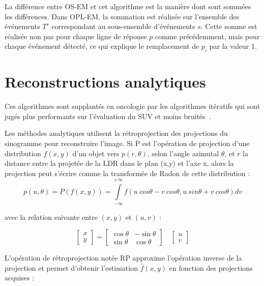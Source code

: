La différence entre OS-EM et cet algorithme est la manière dont sont sommées les différences. Dans OPL-EM, la sommation est réalisée sur l'ensemble des événements $T^s$ correspondant au sous-ensemble d'événements $s$. Cette somme est réalisée non pas pour chaque ligne de réponse $p$ comme précédemment, mais pour chaque événement détecté, ce qui explique le remplacement de $p_i$ par la valeur 1.
		
	\section{Reconstructions analytiques}

Ces algorithmes sont supplantés en oncologie par les algorithmes itératifs qui sont jugés plus performants sur l'évaluation du SUV et moins bruités~\cite{schoder2004clinical}.

Les méthodes analytiques utilisent la rétroprojection des projections du sinogramme pour reconstruire l'image. Si P est l'opération de projection d’une distribution $f(x,y)$ d’un objet vers $p(r, \theta)$, selon l’angle azimutal $\theta$, et $r$ la distance entre la projetée de la LDR dans le plan (x,y) et l’axe x, alors la projection peut s’écrire comme la transformée de Radon de cette distribution :
\begin{equation}
p(u, \theta) = P(f(x,y)) = \int\limits_{-\infty}^{+\infty} f(u~cos \theta - v~cos \theta, u~sin \theta + v~cos \theta) dv
\end{equation}

avec la relation suivante entre $(x,y)$ et $(u,v)$ :

\begin{equation}
	\begin{bmatrix}
	x \\
	y
	\end{bmatrix}
	=	
	\begin{bmatrix}
	\cos \theta &  - \sin \theta \\
	\sin \theta & \cos \theta
	\end{bmatrix}
	\quad
	\begin{bmatrix}
	u \\
	v
	\end{bmatrix}
\end{equation}

L'opération de rétroprojection notée RP approxime l'opération inverse de la projection et permet d'obtenir l'estimation $\hat{f}(x,y)$ en fonction des projections acquises :

